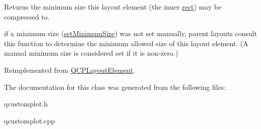 Returns the minimum size this layout element (the inner \hyperlink{class_q_c_p_layout_element_a208effccfe2cca4a0eaf9393e60f2dd4}{rect}) may be compressed to.

if a minimum size (\hyperlink{class_q_c_p_layout_element_a5dd29a3c8bc88440c97c06b67be7886b}{set\+Minimum\+Size}) was not set manually, parent layouts consult this function to determine the minimum allowed size of this layout element. (A manual minimum size is considered set if it is non-\/zero.) 

Reimplemented from \hyperlink{class_q_c_p_layout_element_ab3fdb5c9a5189bb2dac10d4d25329cd8}{Q\+C\+P\+Layout\+Element}.



The documentation for this class was generated from the following files\+:\begin{DoxyCompactItemize}
\item 
qcustomplot.\+h\item 
qcustomplot.\+cpp\end{DoxyCompactItemize}
